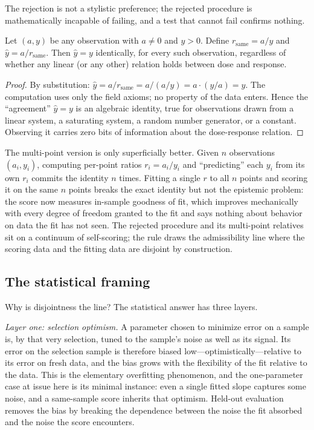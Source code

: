 The rejection is not a stylistic preference; the rejected procedure is
mathematically incapable of failing, and a test that cannot fail confirms
nothing.

\begin{proposition}\label{ch06:prop:tautology}
Let $(a, y)$ be any observation with $a \neq 0$ and $y > 0$. Define
$r_{\mathrm{same}} = a / y$ and $\hat y = a / r_{\mathrm{same}}$. Then
$\hat y = y$ identically, for every such observation, regardless of whether
any linear (or any other) relation holds between dose and response.
\end{proposition}

\begin{proof}
By substitution:
$\hat y = a / r_{\mathrm{same}} = a / (a/y) = a \cdot (y/a) = y$. The
computation uses only the field axioms; no property of the data
enters. Hence the ``agreement'' $\hat y = y$ is an algebraic identity, true
for observations drawn from a linear system, a saturating system, a random
number generator, or a constant. Observing it carries zero bits of
information about the dose-response relation.
\end{proof}

\begin{remark}\label{ch06:rem:pointwise}
The multi-point version is only superficially better. Given $n$
observations $(a_i, y_i)$, computing per-point ratios
$r_i = a_i / y_i$ and ``predicting'' each $y_i$ from its own $r_i$ commits
the identity $n$ times. Fitting a single $r$ to all $n$ points and scoring
it on the same $n$ points breaks the exact identity but not the epistemic
problem: the score now measures in-sample goodness of fit, which improves
mechanically with every degree of freedom granted to the fit and says
nothing about behavior on data the fit has not seen. The rejected procedure
and its multi-point relatives sit on a continuum of self-scoring; the rule
draws the admissibility line where the scoring data and the fitting data
are disjoint by construction.
\end{remark}

\subsection{The statistical framing}\label{ch06:statistics}

Why is disjointness the line? The statistical answer has three layers.

\emph{Layer one: selection optimism.} A parameter chosen to minimize error
on a sample is, by that very selection, tuned to the sample's noise as well
as its signal. Its error on the selection sample is therefore biased
low---optimistically---relative to its error on fresh data, and the bias
grows with the flexibility of the fit relative to the data. This is the
elementary overfitting phenomenon, and the one-parameter case at issue here
is its minimal instance: even a single fitted slope captures some noise,
and a same-sample score inherits that optimism. Held-out evaluation removes
the bias by breaking the dependence between the noise the fit absorbed and
the noise the score encounters.

